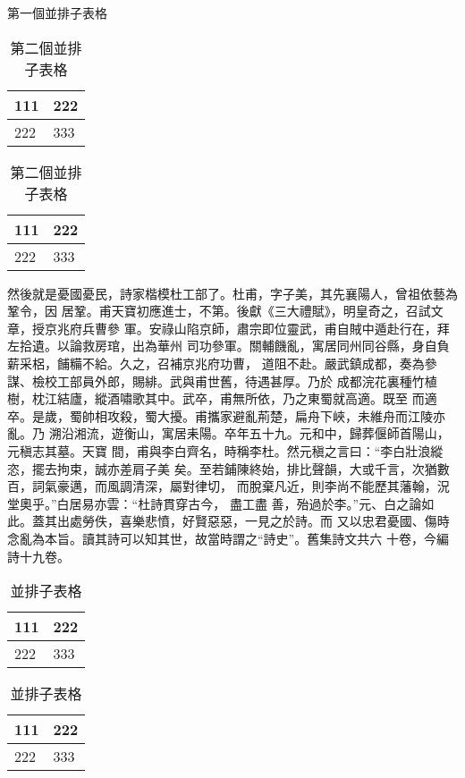 \begin{table}[htbp]
\noindent\begin{minipage}{0.5\textwidth}
\centering
\caption{第一個並排子表格}
\label{tab:parallel1}
\begin{tabular}{p{2cm}p{2cm}}
\toprule[1.5pt]
111 & 222 \\\midrule[1pt]
222 & 333 \\\bottomrule[1.5pt]
\end{tabular}
\end{minipage}%
\begin{minipage}{0.5\textwidth}
\centering
\caption{第二個並排子表格}
\label{tab:parallel2}
\begin{tabular}{p{2cm}p{2cm}}
\toprule[1.5pt]
111 & 222 \\\midrule[1pt]
222 & 333 \\\bottomrule[1.5pt]
\end{tabular}
\end{minipage}
\end{table}

然後就是憂國憂民，詩家楷模杜工部了。杜甫，字子美，其先襄陽人，曾祖依藝為鞏令，因
居鞏。甫天寶初應進士，不第。後獻《三大禮賦》，明皇奇之，召試文章，授京兆府兵曹參
軍。安祿山陷京師，肅宗即位靈武，甫自賊中遁赴行在，拜左拾遺。以論救房琯，出為華州
司功參軍。關輔饑亂，寓居同州同谷縣，身自負薪采梠，餔糒不給。久之，召補京兆府功曹，
道阻不赴。嚴武鎮成都，奏為參謀、檢校工部員外郎，賜緋。武與甫世舊，待遇甚厚。乃於
成都浣花裏種竹植樹，枕江結廬，縱酒嘯歌其中。武卒，甫無所依，乃之東蜀就高適。既至
而適卒。是歲，蜀帥相攻殺，蜀大擾。甫攜家避亂荊楚，扁舟下峽，未維舟而江陵亦亂。乃
溯沿湘流，遊衡山，寓居耒陽。卒年五十九。元和中，歸葬偃師首陽山，元稹志其墓。天寶
間，甫與李白齊名，時稱李杜。然元稹之言曰：“李白壯浪縱恣，擺去拘束，誠亦差肩子美
矣。至若鋪陳終始，排比聲韻，大或千言，次猶數百，詞氣豪邁，而風調清深，屬對律切，
而脫棄凡近，則李尚不能歷其藩翰，況堂奧乎。”白居易亦雲：“杜詩貫穿古今，  盡工盡
善，殆過於李。”元、白之論如此。蓋其出處勞佚，喜樂悲憤，好賢惡惡，一見之於詩。而
又以忠君憂國、傷時念亂為本旨。讀其詩可以知其世，故當時謂之“詩史”。舊集詩文共六
十卷，今編詩十九卷。

\begin{table}[htbp]
\centering
\caption{並排子表格}
\label{tab:subtable}
{
\begin{tabular}{p{2cm}p{2cm}}
\toprule[1.5pt]
111 & 222 \\\midrule[1pt]
222 & 333 \\\bottomrule[1.5pt]
\end{tabular}
}
\hskip2cm
{
\begin{tabular}{p{2cm}p{2cm}}
\toprule[1.5pt]
111 & 222 \\\midrule[1pt]
222 & 333 \\\bottomrule[1.5pt]
\end{tabular}
}
\end{table}

